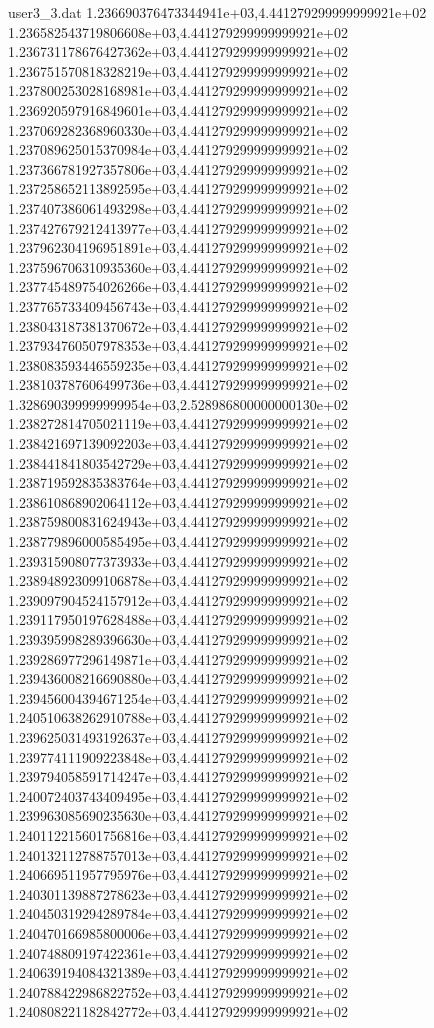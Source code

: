\begin{filecontents}{user3_3.dat}
1.236690376473344941e+03,4.441279299999999921e+02
1.236582543719806608e+03,4.441279299999999921e+02
1.236731178676427362e+03,4.441279299999999921e+02
1.236751570818328219e+03,4.441279299999999921e+02
1.237800253028168981e+03,4.441279299999999921e+02
1.236920597916849601e+03,4.441279299999999921e+02
1.237069282368960330e+03,4.441279299999999921e+02
1.237089625015370984e+03,4.441279299999999921e+02
1.237366781927357806e+03,4.441279299999999921e+02
1.237258652113892595e+03,4.441279299999999921e+02
1.237407386061493298e+03,4.441279299999999921e+02
1.237427679212413977e+03,4.441279299999999921e+02
1.237962304196951891e+03,4.441279299999999921e+02
1.237596706310935360e+03,4.441279299999999921e+02
1.237745489754026266e+03,4.441279299999999921e+02
1.237765733409456743e+03,4.441279299999999921e+02
1.238043187381370672e+03,4.441279299999999921e+02
1.237934760507978353e+03,4.441279299999999921e+02
1.238083593446559235e+03,4.441279299999999921e+02
1.238103787606499736e+03,4.441279299999999921e+02
1.328690399999999954e+03,2.528986800000000130e+02
1.238272814705021119e+03,4.441279299999999921e+02
1.238421697139092203e+03,4.441279299999999921e+02
1.238441841803542729e+03,4.441279299999999921e+02
1.238719592835383764e+03,4.441279299999999921e+02
1.238610868902064112e+03,4.441279299999999921e+02
1.238759800831624943e+03,4.441279299999999921e+02
1.238779896000585495e+03,4.441279299999999921e+02
1.239315908077373933e+03,4.441279299999999921e+02
1.238948923099106878e+03,4.441279299999999921e+02
1.239097904524157912e+03,4.441279299999999921e+02
1.239117950197628488e+03,4.441279299999999921e+02
1.239395998289396630e+03,4.441279299999999921e+02
1.239286977296149871e+03,4.441279299999999921e+02
1.239436008216690880e+03,4.441279299999999921e+02
1.239456004394671254e+03,4.441279299999999921e+02
1.240510638262910788e+03,4.441279299999999921e+02
1.239625031493192637e+03,4.441279299999999921e+02
1.239774111909223848e+03,4.441279299999999921e+02
1.239794058591714247e+03,4.441279299999999921e+02
1.240072403743409495e+03,4.441279299999999921e+02
1.239963085690235630e+03,4.441279299999999921e+02
1.240112215601756816e+03,4.441279299999999921e+02
1.240132112788757013e+03,4.441279299999999921e+02
1.240669511957795976e+03,4.441279299999999921e+02
1.240301139887278623e+03,4.441279299999999921e+02
1.240450319294289784e+03,4.441279299999999921e+02
1.240470166985800006e+03,4.441279299999999921e+02
1.240748809197422361e+03,4.441279299999999921e+02
1.240639194084321389e+03,4.441279299999999921e+02
1.240788422986822752e+03,4.441279299999999921e+02
1.240808221182842772e+03,4.441279299999999921e+02

\end{filecontents}
